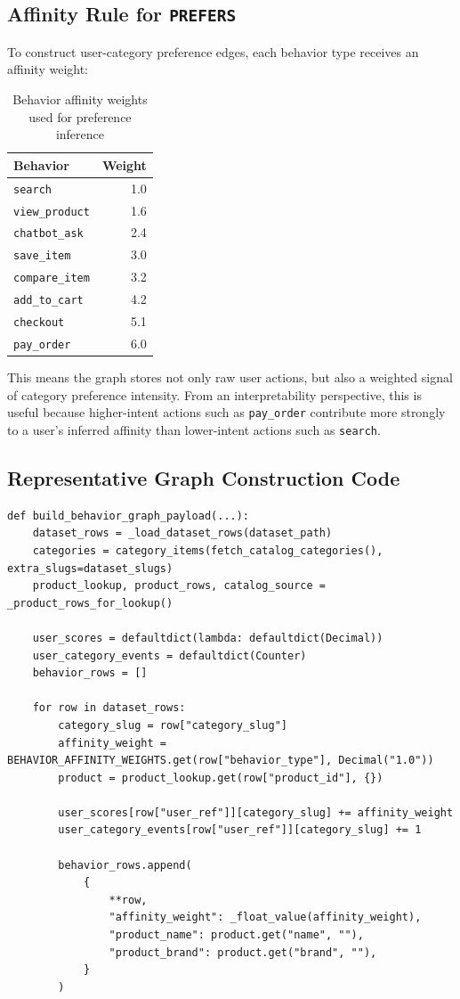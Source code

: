 \documentclass[12pt,a4paper]{article}
\begin{document}
\subsection{Affinity Rule for \texttt{PREFERS}}
To construct user-category preference edges, each behavior type receives an affinity weight:

\begin{table}[H]
\centering
\caption{Behavior affinity weights used for preference inference}
\begin{tabular}{lr}
\toprule
Behavior & Weight \\
\midrule
\texttt{search} & 1.0 \\
\texttt{view\_product} & 1.6 \\
\texttt{chatbot\_ask} & 2.4 \\
\texttt{save\_item} & 3.0 \\
\texttt{compare\_item} & 3.2 \\
\texttt{add\_to\_cart} & 4.2 \\
\texttt{checkout} & 5.1 \\
\texttt{pay\_order} & 6.0 \\
\bottomrule
\end{tabular}
\end{table}

This means the graph stores not only raw user actions, but also a weighted signal of category preference intensity. From an interpretability perspective, this is useful because higher-intent actions such as \texttt{pay\_order} contribute more strongly to a user's inferred affinity than lower-intent actions such as \texttt{search}.

\subsection{Representative Graph Construction Code}
\begin{lstlisting}[caption={Representative code for graph payload construction}]
def build_behavior_graph_payload(...):
    dataset_rows = _load_dataset_rows(dataset_path)
    categories = category_items(fetch_catalog_categories(), extra_slugs=dataset_slugs)
    product_lookup, product_rows, catalog_source = _product_rows_for_lookup()

    user_scores = defaultdict(lambda: defaultdict(Decimal))
    user_category_events = defaultdict(Counter)
    behavior_rows = []

    for row in dataset_rows:
        category_slug = row["category_slug"]
        affinity_weight = BEHAVIOR_AFFINITY_WEIGHTS.get(row["behavior_type"], Decimal("1.0"))
        product = product_lookup.get(row["product_id"], {})

        user_scores[row["user_ref"]][category_slug] += affinity_weight
        user_category_events[row["user_ref"]][category_slug] += 1

        behavior_rows.append(
            {
                **row,
                "affinity_weight": _float_value(affinity_weight),
                "product_name": product.get("name", ""),
                "product_brand": product.get("brand", ""),
            }
        )
\end{lstlisting}
\end{document}
